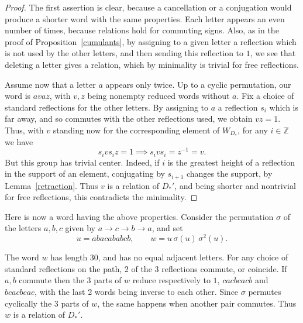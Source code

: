 \documentclass[11pt,a4paper]{article}
\begin{document}
\begin{proof}
The first assertion is clear, because a cancellation or a conjugation would produce a shorter word with the same properties. Each letter appears an even number of times, because relations hold for commuting signs. Also, as in the proof of Proposition~\ref{cumulants}, by assigning to a given letter a reflection which is not used by the other letters, and then sending this reflection to $1$, we see that deleting a letter gives a relation, which by minimality is trivial for free reflections.

Assume now that a letter $a$ appears only twice. Up to a cyclic permutation, our word is $avaz$, with $v,z$ being nonempty reduced words without $a$. Fix a choice of standard reflections for the other letters. By assigning to $a$ a reflection $s_i$ which is far away, and so commutes with the other reflections used, we obtain $vz=1$. Thus, with $v$ standing now for the corresponding element of $W_{D_*}$, for any $i\in\mathbb Z$ we have
\[
 s_ivs_iz=1\implies s_ivs_i=z^{-1}=v.
\]
 But this group has trivial center. Indeed, if $i$ is the greatest height of a reflection in the support of an element, conjugating by $s_{i+1}$ changes the support, by Lemma~\ref{retraction}. Thus $v$ is a relation of $D_*'$, and being shorter and nontrivial for free reflections, this contradicts the minimality.
\end{proof}

Here is now a word having the above properties. Consider the permutation $\sigma$ of the letters $a,b,c$ given by $a\to c\to b\to a$, and set
\[
 u=abacababcb,\qquad w=u\,\sigma(u)\,\sigma^2(u).
\]

The word $w$ has length 30, and has no equal adjacent letters. For any choice of standard reflections on the path, 2 of the 3 reflections commute, or coincide. If $a,b$ commute then the 3 parts of $w$ reduce respectively to $1$, $cacbcacb$ and $bcacbcac$, with the last 2 words being inverse to each other. Since $\sigma$ permutes cyclically the 3 parts of $w$, the same happens when another pair commutes. Thus $w$ is a relation of $D_*'$.
\end{document}
